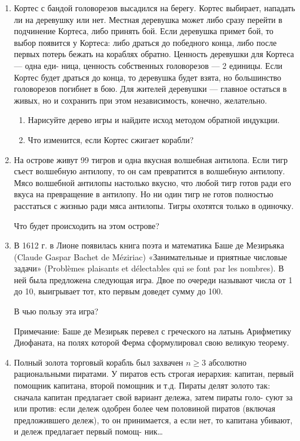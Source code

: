 \documentclass[12pt]{article}
\begin{document}
\begin{enumerate}

   \item Кортес с бандой головорезов высадился на берегу. Кортес выбирает, нападать ли на деревушку
   или нет. Местная деревушка может либо сразу перейти в подчинение Кортеса, либо принять бой.
   Если деревушка примет бой, то выбор появится у Кортеса: либо драться до победного конца, либо
   после первых потерь бежать на кораблях обратно. Ценность деревушки для Кортеса — одна еди-
   ница, ценность собственных головорезов — 2 единицы. Если Кортес будет драться до конца, то
   деревушка будет взята, но большинство головорезов погибнет в бою. Для жителей деревушки —
   главное остаться в живых, но и сохранить при этом независимость, конечно, желательно.
   
   \begin{enumerate}
    \item Нарисуйте дерево игры и найдите исход методом обратной индукции.
    \item Что изменится, если Кортес сжигает корабли?
   \end{enumerate}
   
   \item На острове живут 99 тигров и одна вкусная волшебная антилопа.
   Если тигр съест волшебную антилопу, то он сам превратится в волшебную антилопу. 
   Мясо волшебной антилопы настолько вкусно, что любой тигр готов ради его вкуса на превращение в антилопу. 
   Но ни один тигр не готов полностью расстаться с жизнью ради мяса антилопы. Тигры
   охотятся только в одиночку.
   
   Что будет происходить на этом острове?

   
   \item В 1612 г. в Лионе появилась книга поэта и математика Баше де Мезирьяка (Claude Gaspar Bachet
   de Méziriac) «Занимательные и приятные числовые задачи» (Problèmes plaisants et délectables qui
   se font par les nombres). В ней была предложена следующая игра. Двое по очереди называют числа
   от 1 до 10, выигрывает тот, кто первым доведет сумму до 100. 
   
   
   В чью пользу эта игра?
   
   Примечание: Баше де Мезирьяк перевел с греческого на латынь Арифметику Диофаната, 
   на полях которой Ферма сформулировал свою великую теорему.   

   \newpage

   \item Полный золота торговый корабль был захвачен $n\geq 3$ абсолютно рациональными пиратами.
   У пиратов есть строгая иерархия: капитан, первый помощник капитана, второй помощник и т.д.
   Пираты делят золото так: сначала капитан предлагает свой вариант дележа, затем пираты голо-
   суют за или против: если дележ одобрен более чем половиной пиратов (включая предложившего
   дележ), то он принимается, а если нет, то капитана убивают, и дележ предлагает первый помощ-
   ник\ldots
   

\end{enumerate}
\end{document}
